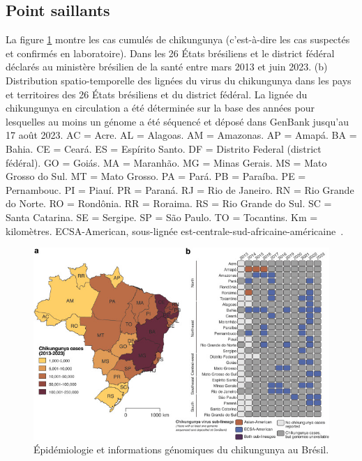 \subsection{Point saillants}
La figure \ref{fig:brazilregionscases} montre les cas cumulés de chikungunya (c'est-à-dire les cas suspectés et confirmés en laboratoire). Dans les 26 États brésiliens et le district fédéral déclarés au ministère brésilien de la santé entre mars 2013 et juin 2023. (b) Distribution spatio-temporelle des lignées du virus du chikungunya dans les pays et territoires des 26 États brésiliens et du district fédéral. La lignée du chikungunya en circulation a été déterminée sur la base des années pour lesquelles au moins un génome a été séquencé et déposé dans GenBank jusqu'au 17 août 2023. AC = Acre. AL = Alagoas. AM = Amazonas. AP = Amapá. BA = Bahia. CE = Ceará. ES = Espírito Santo. DF = Distrito Federal (district fédéral). GO = Goiás. MA = Maranhão. MG = Minas Gerais. MS = Mato Grosso do Sul. MT = Mato Grosso. PA = Pará. PB = Paraíba. PE = Pernambouc. PI = Piauí. PR = Paraná. RJ = Rio de Janeiro. RN = Rio Grande do Norte. RO = Rondônia. RR = Roraima. RS = Rio Grande do Sul. SC = Santa Catarina. SE = Sergipe. SP = São Paulo. TO = Tocantins. Km = kilomètres. ECSA-American, sous-lignée est-centrale-sud-africaine-américaine~\cite{DESOUZA2024100673}.
\begin{figure}[h!]
	\centering
	\includegraphics[width=0.9\linewidth]{images/brazil_regions_cases}
	\caption{Épidémiologie et informations génomiques du chikungunya au Brésil.\cite{chikungunya_burden_americas}}
	\label{fig:brazilregionscases}
\end{figure}
